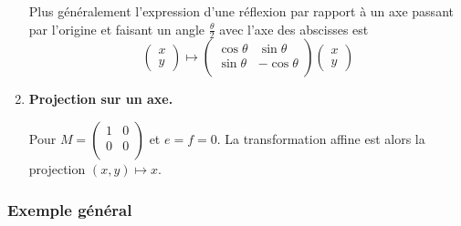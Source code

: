 \documentclass[11pt,class=report,crop=false]{standalone}
\begin{document}
\begin{exemple}
\begin{enumerate}
\begin{minipage}{0.55\textwidth}
			Plus généralement l'expression d'une réflexion par rapport à un axe passant par l'origine et faisant un angle $\frac\theta2$ avec l'axe des abscisses est
			$$\begin{pmatrix}x \\ y \end{pmatrix} \mapsto \begin{pmatrix}\cos \theta & \sin \theta \\ 
				\sin\theta & -\cos \theta\\ \end{pmatrix}\begin{pmatrix}x \\ y \end{pmatrix}$$
		\end{minipage}
		\begin{minipage}{0.45\textwidth}
		\end{minipage}
		\item \textbf{Projection sur un axe.}
		
		\begin{minipage}{0.55\textwidth}
			Pour $M=\left(\begin{smallmatrix} 1 & 0 \\ 0 & 0 \\ 
			\end{smallmatrix} \right)$ 
			et $e=f=0$. La transformation affine est alors la projection $(x,y) \mapsto x$.
		\end{minipage}
		\begin{minipage}{0.45\textwidth}
		\end{minipage}
		
	\end{enumerate}
\end{exemple}


\subsubsection*{Exemple général}
\end{document}
